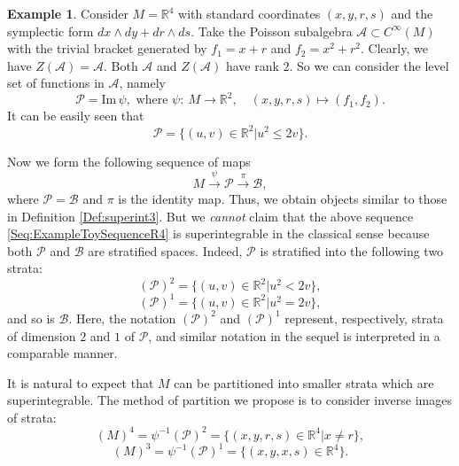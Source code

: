 \documentclass[12pt]{amsart}
\theoremstyle{definition}
\newtheorem{example}[theorem]{Example}
\numberwithin{equation}{section}
\def\Im{\mathrm{Im}\,}
\newcommand{\Cinf}{C^\infty}
\newcommand{\SET}[1]{\{#1\}}
\begin{document}
 \begin{example}
    \label{Ex:R4}
    Consider $M =\mathbb{R}^4$ with standard coordinates $(x,y,r,s)$ and the symplectic form
    $dx\wedge dy+dr\wedge ds$.  Take the   Poisson subalgebra $\mathcal{A}\subset \Cinf(M )$ with the trivial bracket generated by   $  f_1=   x +r$ and  $f_2= {x}^2+r^2 $. Clearly, we have $Z(\mathcal{A})=\mathcal{A}$. Both $\mathcal{A}$ and $Z(\mathcal{A})$ have rank $2$. So we can consider the level set of functions in $\mathcal{A}$, namely
    $$
    \mathcal{P} =\Im \psi, \mbox{ where } \psi: ~M \to \mathbb{R}^2,\quad (x,y,r,s)\mapsto (f_1,f_2).
    $$
    It can be easily seen that 
 $$\mathcal{P}  =\SET{(u,v)\in \mathbb{R}^2|  u^2\leqslant 2v} .$$    
    
    
     Now we form the following sequence of maps
 \begin{equation} \label{Seq:ExampleToySequenceR4} M   \overset{\psi}{\longrightarrow} \mathcal{P}  \overset{\pi}{\longrightarrow} \mathcal{B} ,
  \end{equation}
 where  $\mathcal{P} =\mathcal{B}  $   and
 $\pi$ is the identity map. Thus, we obtain objects similar to those in Definition \ref{Def:superint3}.  But we \emph{cannot} claim that the above sequence \eqref{Seq:ExampleToySequenceR4} is superintegrable in the classical sense because both $\mathcal{P} $ and $\mathcal{B} $ are  stratified spaces.  
 Indeed, $\mathcal{P} $ is stratified into the following two strata: $$(\mathcal{P})^2=\SET{(u,v)\in \mathbb{R}^2|  u^2<2v},$$ 
 $$(\mathcal{P})^1 =\SET{(u,v)\in \mathbb{R}^2|  u^2=2v},$$
 and so is $\mathcal{B} $. Here, the notation $(\mathcal{P})^2$ and $(\mathcal{P})^1$ represent, respectively,  strata of  dimension $2$ and $1$   of $\mathcal{P} $,  and similar notation  in the sequel is interpreted in a comparable manner.
 
 
  It is natural to expect that $M $ can be partitioned into smaller strata which are superintegrable.   The method of partition we propose is to consider  inverse images of strata:  
      $$
   (M)^4=\psi^{-1} (\mathcal{P})^2 =
   \SET{(x,y,r,s)\in \mathbb{R}^4| x\neq r},
   $$
   $$(M)^3 =\psi^{-1}(\mathcal{P})^1 =
   \SET{(x,y,x,s)\in \mathbb{R}^4 }.
      $$
      
      
   

\end{example}
\end{document}

